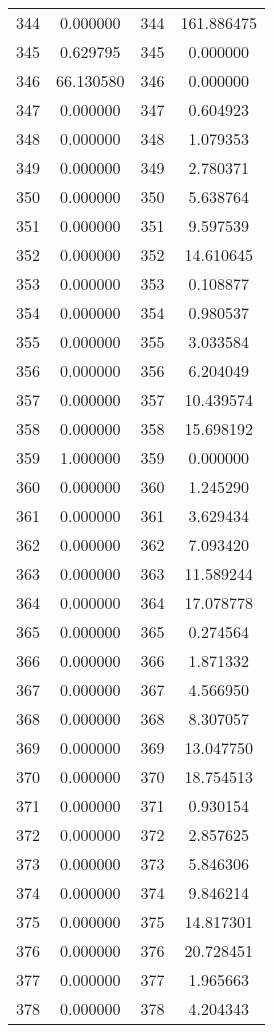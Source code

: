 \documentclass[12pt]{article}
\begin{document}
\begin{longtable}{@{}cccc@{}}
344 & 0.000000 & 344 & 161.886475 \\
345 & 0.629795 & 345 & 0.000000 \\
346 & 66.130580 & 346 & 0.000000 \\
347 & 0.000000 & 347 & 0.604923 \\
348 & 0.000000 & 348 & 1.079353 \\
349 & 0.000000 & 349 & 2.780371 \\
350 & 0.000000 & 350 & 5.638764 \\
351 & 0.000000 & 351 & 9.597539 \\
352 & 0.000000 & 352 & 14.610645 \\
353 & 0.000000 & 353 & 0.108877 \\
354 & 0.000000 & 354 & 0.980537 \\
355 & 0.000000 & 355 & 3.033584 \\
356 & 0.000000 & 356 & 6.204049 \\
357 & 0.000000 & 357 & 10.439574 \\
358 & 0.000000 & 358 & 15.698192 \\
359 & 1.000000 & 359 & 0.000000 \\
360 & 0.000000 & 360 & 1.245290 \\
361 & 0.000000 & 361 & 3.629434 \\
362 & 0.000000 & 362 & 7.093420 \\
363 & 0.000000 & 363 & 11.589244 \\
364 & 0.000000 & 364 & 17.078778 \\
365 & 0.000000 & 365 & 0.274564 \\
366 & 0.000000 & 366 & 1.871332 \\
367 & 0.000000 & 367 & 4.566950 \\
368 & 0.000000 & 368 & 8.307057 \\
369 & 0.000000 & 369 & 13.047750 \\
370 & 0.000000 & 370 & 18.754513 \\
371 & 0.000000 & 371 & 0.930154 \\
372 & 0.000000 & 372 & 2.857625 \\
373 & 0.000000 & 373 & 5.846306 \\
374 & 0.000000 & 374 & 9.846214 \\
375 & 0.000000 & 375 & 14.817301 \\
376 & 0.000000 & 376 & 20.728451 \\
377 & 0.000000 & 377 & 1.965663 \\
378 & 0.000000 & 378 & 4.204343 \\

\end{longtable}
\end{document}
